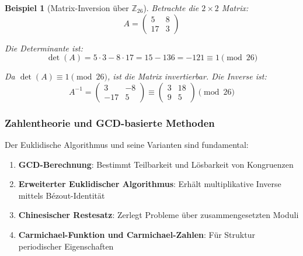 ﻿\documentclass[12pt,a4paper]{article}
\newtheorem{example}{Beispiel}
\begin{document}
	\begin{example}[Matrix-Inversion über $\mathbb{Z}_{26}$]
		Betrachte die $2 \times 2$ Matrix:
		\begin{equation}
			A = \begin{pmatrix} 5 & 8 \\ 17 & 3 \end{pmatrix}
		\end{equation}
		
		Die Determinante ist:
		\begin{equation}
			\det(A) = 5 \cdot 3 - 8 \cdot 17 = 15 - 136 = -121 \equiv 1 \pmod{26}
		\end{equation}
		
		Da $\det(A) \equiv 1 \pmod{26}$, ist die Matrix invertierbar. Die Inverse ist:
		\begin{equation}
			A^{-1} = \begin{pmatrix} 3 & -8 \\ -17 & 5 \end{pmatrix} \equiv \begin{pmatrix} 3 & 18 \\ 9 & 5 \end{pmatrix} \pmod{26}
		\end{equation}
	\end{example}
	
	\subsubsection{Zahlentheorie und GCD-basierte Methoden}
	
	Der Euklidische Algorithmus und seine Varianten sind fundamental:
	\begin{enumerate}
		\item \textbf{GCD-Berechnung}: Bestimmt Teilbarkeit und Lösbarkeit von Kongruenzen
		\item \textbf{Erweiterter Euklidischer Algorithmus}: Erhält multiplikative Inverse mittels Bézout-Identität
		\item \textbf{Chinesischer Restesatz}: Zerlegt Probleme über zusammengesetzten Moduli
		\item \textbf{Carmichael-Funktion und Carmichael-Zahlen}: Für Struktur periodischer Eigenschaften
	\end{enumerate}
	
\end{document}

